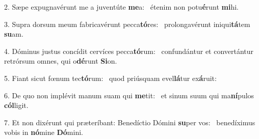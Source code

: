 2. Sæpe expugnavérunt me a juventúte \textbf{me}a: \ast\  étenim non potu\textbf{é}runt \textbf{mi}hi.\

3. Supra dorsum meum fabricavérunt pecca\textbf{tó}res: \ast\  prolongavérunt iniqui\textbf{tá}tem \textbf{su}am.\

4. Dóminus justus concídit cervíces pecca\textbf{tó}rum: \ast\  confundántur et convertántur retrórsum omnes, qui o\textbf{dé}runt \textbf{Si}on.\

5. Fiant sicut fœnum tec\textbf{tó}rum: \ast\  quod priúsquam evel\textbf{lá}tur ex\textbf{á}ruit:\

6. De quo non implévit manum suam qui \textbf{me}tit: \ast\  et sinum suum qui ma\textbf{ní}pulos \textbf{cól}ligit.\

7. Et non dixérunt qui præteríbant: Benedíctio Dómini \textbf{su}per vos: \ast\  benedíximus vobis in \textbf{nó}mine \textbf{Dó}mini.\

